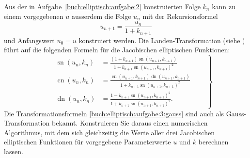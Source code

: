 \label{buch:elliptisch:aufgabe:3}%
Aus der in Aufgabe~\ref{buch:elliptisch:aufgabe:2} konstruierten Folge
$k_n$ kann zu einem vorgegebenen $u$ ausserdem die Folge $u_n$
mit der Rekursionsformel
\[
u_{n+1} = \frac{u_n}{1+k_{n+1}}
\]
und Anfangswert $u_0=u$ konstruiert werden.
Die Landen-Transformation (siehe \cite[80]{buch:ellfun-applications})
%
führt auf die folgenden Formeln für die Jacobischen elliptischen Funktionen:
\begin{equation}
\left.\qquad
\begin{aligned}
\operatorname{sn}(u_n,k_n)
&=
\frac{
(1+k_{n+1})\operatorname{sn}(u_{n+1},k_{n+1})
}{
1 + k_{n+1} \operatorname{sn}(u_{n+1},k_{n+1})^2
}
\\
\operatorname{cn}(u_n,k_n)
&=
\frac{
\operatorname{cn}(u_{n+1},k_{n+1})
\operatorname{dn}(u_{n+1},k_{n+1})
}{
1 + k_{n+1} \operatorname{sn}(u_{n+1},k_{n+1})^2
}
\\
\operatorname{dn}(u_n,k_n)
&=
\frac{
1 - k_{n+1} \operatorname{sn}(u_{n+1},k_{n+1})^2
}{
1 + k_{n+1} \operatorname{sn}(u_{n+1},k_{n+1})^2
}.
\end{aligned}
\qquad\right\}
\label{buch:elliptisch:aufgabe:3:gauss}
\end{equation}
Die Transformationsformeln
\eqref{buch:elliptisch:aufgabe:3:gauss}
sind auch als Gauss-Transformation bekannt.
%
Konstruieren Sie daraus einen numerischen Algorithmus, mit dem sich
gleichzeitig die Werte aller drei Jacobischen elliptischen Funktionen
für vorgegebene Parameterwerte $u$ und $k$ berechnen lassen.

